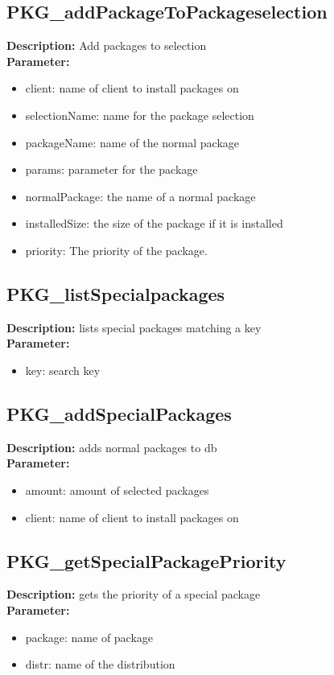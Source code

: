 \subsection{PKG\_addPackageToPackageselection}
\textbf{Description:} Add packages to selection\\
\textbf{Parameter:}
\begin{itemize}
\item client: name of client to install packages on
\item selectionName: name for the package selection
\item packageName: name of the normal package
\item params: parameter for the package
\item normalPackage: the name of a normal package
\item installedSize: the size of the package if it is installed
\item priority: The priority of the package.
\end{itemize}

\subsection{PKG\_listSpecialpackages}
\textbf{Description:} lists special packages matching a key\\
\textbf{Parameter:}
\begin{itemize}
\item key: search key
\end{itemize}

\subsection{PKG\_addSpecialPackages}
\textbf{Description:} adds normal packages to db\\
\textbf{Parameter:}
\begin{itemize}
\item amount: amount of selected packages
\item client: name of client to install packages on
\end{itemize}

\subsection{PKG\_getSpecialPackagePriority}
\textbf{Description:} gets the priority of a special package\\
\textbf{Parameter:}
\begin{itemize}
\item package: name of package
\item distr: name of the distribution
\end{itemize}

